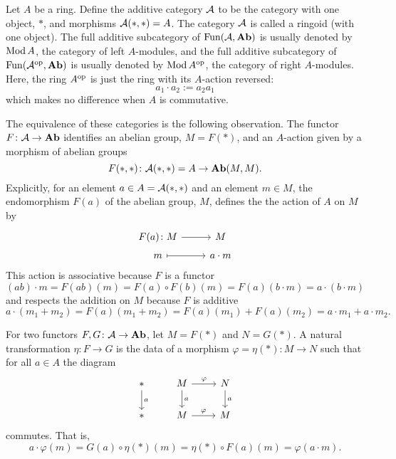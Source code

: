 \documentclass[reqno, 12pt]{amsart}
\begin{document}
\begin{example}
  Let $A$ be a ring.
  Define the additive category $\mathcal{A}$ to be the category with one object, $\ast$, and morphisms $\mathcal{A}(\ast,\ast) = A$.
  The category $\mathcal{A}$ is called a ringoid (with one object).
  The full additive subcategory of $\operatorname{Fun}(\mathcal{A}, \operatorname{\bf Ab})$ is usually denoted by $\operatorname{Mod}A$, the category of left $A$-modules, and the full additive subcategory of $\operatorname{Fun}(\mathcal{A}^{\operatorname{op}}, \operatorname{\bf Ab})$ is usually denoted by $\operatorname{Mod}A^{\operatorname{op}}$, the category of right $A$-modules.
  Here, the ring $A^{\operatorname{op}}$ is just the ring with its $A$-action reversed:
  $$a_1 \cdot a_2 := a_2a_1$$
  which makes no difference when $A$ is commutative.

  The equivalence of these categories is the following observation.
  The functor $F \colon \mathcal{A} \to \operatorname{\bf Ab}$ identifies an abelian group, $M = F(\ast)$, and an $A$-action given by a morphism of abelian groups
  $$F(\ast,\ast) \colon \mathcal{A}(\ast,\ast) = A \to \operatorname{\bf Ab}(M,M).$$
  Explicitly, for an element $a \in A = \mathcal{A}(\ast,\ast)$ and an element $m \in M$, the endomorphism $F(a)$ of the abelian group, $M$, defines the the action of $A$ on $M$ by
  $$\begin{tikzcd}[row sep=tiny]
    F(a) \colon M \arrow{r}& M\\
    m \arrow[mapsto]{r} & a \cdot m
  \end{tikzcd}$$
  This action is associative because $F$ is a functor
  $$(ab) \cdot m = F(ab)(m) = F(a) \circ F(b)(m) = F(a)(b \cdot m) = a \cdot( b \cdot m)$$
  and respects the addition on $M$ because $F$ is additive
  $$a \cdot (m_1 + m_2) = F(a)(m_1 + m_2) = F(a)(m_1) + F(a)(m_2) = a \cdot m_1 + a \cdot m_2.$$

  For two functors $F,G \colon \mathcal{A} \to \operatorname{\bf Ab}$, let $M = F(\ast)$ and $N = G(\ast)$.
  A natural transformation $\eta \colon F \to G$ is the data of a morphism $\varphi = \eta(\ast) \colon M \to N$ such that for all $a \in A$ the diagram  
  $$\begin{tikzcd}
    \ast \arrow{d}{a} & M \arrow{r}{\varphi}\arrow{d}{a} & N\arrow{d}{a}\\
    \ast & M \arrow{r}{\varphi} & M
  \end{tikzcd}$$
  commutes.
  That is,
  $$a \cdot \varphi(m) = G(a) \circ \eta(\ast)(m)= \eta(\ast) \circ F(a)(m) = \varphi(a \cdot m).$$
\end{example}
\end{document}

